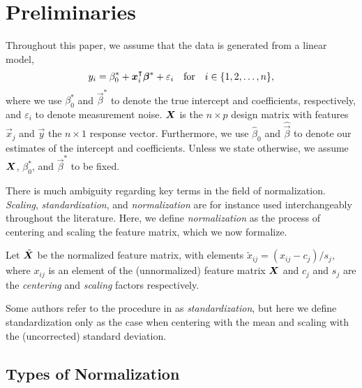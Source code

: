 \section{Preliminaries}

Throughout this paper, we assume that the data is generated from a linear model,
\[
  y_i = \beta_0^* + \boldsymbol x_i^\intercal \boldsymbol\beta^* + \varepsilon_i \quad\text{for}\quad i \in \{1, 2, \dots, n\},
\]
where we use \(\beta_0^*\) and \(\vec\beta^*\) to denote the true intercept and
coefficients, respectively, and \(\varepsilon_i\) to denote measurement noise. \(\boldsymbol X\)
is the \(n \times p\) design matrix with features \(\vec x_j\) and \(\vec y\) the \(n
\times 1\) response vector. Furthermore, we use \(\hat\beta_0\) and \(\hat{\vec{\beta}}\)
to denote our estimates of the intercept and coefficients. Unless we state otherwise, we
assume \(\boldsymbol{X}\), \(\beta_0^*\), and \(\vec{\beta}^*\) to be fixed.

There is much ambiguity regarding key terms in the field of normalization. \emph{Scaling},
\emph{standardization}, and \emph{normalization} are for instance used interchangeably
throughout the literature. Here, we define \emph{normalization} as the process of centering
and scaling the feature matrix, which we now formalize.

\begin{definition}[Normalization]
  \label{def:normalization}
  Let \(\tilde{\boldsymbol X}\) be the normalized feature matrix, with elements \(\tilde{x}_{ij} =
  (x_{ij} - c_{j})/s_j,\) where \(x_{ij}\) is an element of the (unnormalized) feature matrix
  \(\boldsymbol{X}\) and \(c_j\) and \(s_j\) are the \emph{centering} and \emph{scaling} factors
  respectively.
\end{definition}

Some authors refer to the procedure in  as \emph{standardization},
but here we define standardization only as the case when centering with the mean and
scaling with the (uncorrected) standard deviation.

\subsection{Types of Normalization}

